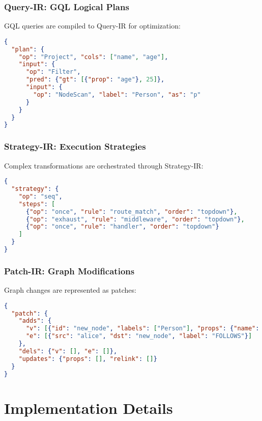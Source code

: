 \documentclass[11pt,a4paper]{article}
\begin{document}
\subsubsection{Query-IR: GQL Logical Plans}
\label{subsubsec:query_ir}

GQL queries are compiled to Query-IR for optimization:

\begin{lstlisting}[language=json,caption=GQL Query-IR example]
{
  "plan": {
    "op": "Project", "cols": ["name", "age"],
    "input": {
      "op": "Filter",
      "pred": {"gt": [{"prop": "age"}, 25]},
      "input": {
        "op": "NodeScan", "label": "Person", "as": "p"
      }
    }
  }
}
\end{lstlisting}

\subsubsection{Strategy-IR: Execution Strategies}
\label{subsubsec:strategy_ir}

Complex transformations are orchestrated through Strategy-IR:

\begin{lstlisting}[language=json,caption=Strategy-IR example]
{
  "strategy": {
    "op": "seq",
    "steps": [
      {"op": "once", "rule": "route_match", "order": "topdown"},
      {"op": "exhaust", "rule": "middleware", "order": "topdown"},
      {"op": "once", "rule": "handler", "order": "topdown"}
    ]
  }
}
\end{lstlisting}

\subsubsection{Patch-IR: Graph Modifications}
\label{subsubsec:patch_ir}

Graph changes are represented as patches:

\begin{lstlisting}[language=json,caption=Patch-IR example]
{
  "patch": {
    "adds": {
      "v": [{"id": "new_node", "labels": ["Person"], "props": {"name": "Charlie"}}],
      "e": [{"src": "alice", "dst": "new_node", "label": "FOLLOWS"}]
    },
    "dels": {"v": [], "e": []},
    "updates": {"props": [], "relink": []}
  }
}
\end{lstlisting}

\section{Implementation Details}
\label{sec:implementation}
\end{document}
